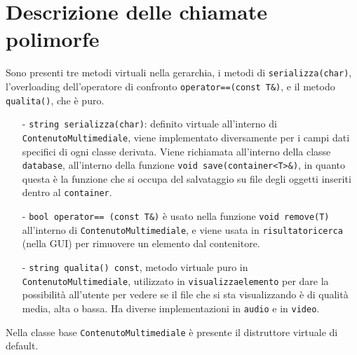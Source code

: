 \documentclass[a4paper,10pt]{article}
\begin{document}
\section{Descrizione delle chiamate polimorfe}
Sono presenti tre metodi virtuali nella gerarchia, i metodi di \texttt{serializza(char)}, l'overloading dell'operatore di confronto \texttt{operator==(const T\&)}, e il metodo \texttt{qualita()}, che è puro.
\begin{enumerate}
	\item [-] \texttt{string serializza(char)}: definito virtuale all'interno di \texttt{ContenutoMultimediale}, viene implementato diversamente per i campi dati specifici di ogni classe derivata. Viene richiamata all'interno della classe \texttt{database}, all'interno della funzione \texttt{void save(container<T>\&)}, in quanto questa è la funzione che si occupa del salvataggio su file degli oggetti inseriti dentro al \texttt{container}.
	\item [-] \texttt{bool operator== (const T\&)} è usato nella funzione \texttt{void remove(T)} all'interno di \texttt{ContenutoMultimediale}, e viene usata in \texttt{risultatoricerca} (nella GUI) per rimuovere un elemento dal contenitore. 
	\item [-] \texttt{string qualita() const}, metodo virtuale puro in \texttt{ContenutoMultimediale}, utilizzato in \texttt{visualizzaelemento} per dare la possibilità all'utente per vedere se il file che si sta visualizzando è di qualità media, alta o bassa. Ha diverse implementazioni in \texttt{audio} e in \texttt{video}.
\end{enumerate}
Nella classe base \texttt{ContenutoMultimediale} è presente il distruttore virtuale di default.
\end{document}
